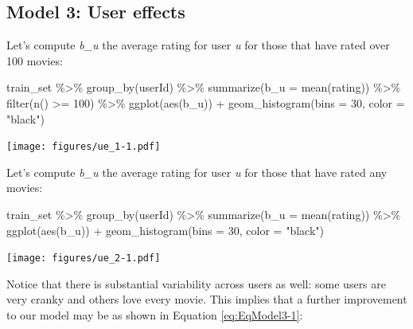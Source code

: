 \documentclass[
]{article}
\newenvironment{Shaded}{}{}
\newcommand{\AttributeTok}[1]{\textcolor[rgb]{0.49,0.56,0.16}{#1}}
\newcommand{\DecValTok}[1]{\textcolor[rgb]{0.25,0.63,0.44}{#1}}
\newcommand{\FunctionTok}[1]{\textcolor[rgb]{0.02,0.16,0.49}{#1}}
\newcommand{\NormalTok}[1]{#1}
\newcommand{\SpecialCharTok}[1]{\textcolor[rgb]{0.25,0.44,0.63}{#1}}
\newcommand{\StringTok}[1]{\textcolor[rgb]{0.25,0.44,0.63}{#1}}
\begin{document}
\newpage

\hypertarget{model-3-user-effects}{%
\subsection{Model 3: User effects}\label{model-3-user-effects}}

Let's compute \emph{b\_u} the average rating for user \emph{u} for those
that have rated over 100 movies:

\begin{Shaded}
\begin{Highlighting}[]
\NormalTok{train\_set }\SpecialCharTok{\%\textgreater{}\%} \FunctionTok{group\_by}\NormalTok{(userId) }\SpecialCharTok{\%\textgreater{}\%} \FunctionTok{summarize}\NormalTok{(}\AttributeTok{b\_u =} \FunctionTok{mean}\NormalTok{(rating)) }\SpecialCharTok{\%\textgreater{}\%} 
    \FunctionTok{filter}\NormalTok{(}\FunctionTok{n}\NormalTok{() }\SpecialCharTok{\textgreater{}=} \DecValTok{100}\NormalTok{) }\SpecialCharTok{\%\textgreater{}\%} \FunctionTok{ggplot}\NormalTok{(}\FunctionTok{aes}\NormalTok{(b\_u)) }\SpecialCharTok{+} \FunctionTok{geom\_histogram}\NormalTok{(}\AttributeTok{bins =} \DecValTok{30}\NormalTok{, }
    \AttributeTok{color =} \StringTok{"black"}\NormalTok{)}
\end{Highlighting}
\end{Shaded}

\texttt{[image: figures/ue\_1-1.pdf]}

\newpage

Let's compute \emph{b\_u} the average rating for user \emph{u} for those
that have rated any movies:

\begin{Shaded}
\begin{Highlighting}[]
\NormalTok{train\_set }\SpecialCharTok{\%\textgreater{}\%} \FunctionTok{group\_by}\NormalTok{(userId) }\SpecialCharTok{\%\textgreater{}\%} \FunctionTok{summarize}\NormalTok{(}\AttributeTok{b\_u =} \FunctionTok{mean}\NormalTok{(rating)) }\SpecialCharTok{\%\textgreater{}\%} 
    \FunctionTok{ggplot}\NormalTok{(}\FunctionTok{aes}\NormalTok{(b\_u)) }\SpecialCharTok{+} \FunctionTok{geom\_histogram}\NormalTok{(}\AttributeTok{bins =} \DecValTok{30}\NormalTok{, }\AttributeTok{color =} \StringTok{"black"}\NormalTok{)}
\end{Highlighting}
\end{Shaded}

\texttt{[image: figures/ue\_2-1.pdf]}

Notice that there is substantial variability across users as well: some
users are very cranky and others love every movie. This implies that a
further improvement to our model may be as shown in Equation
\ref{eq:EqModel3-1}:
\end{document}
